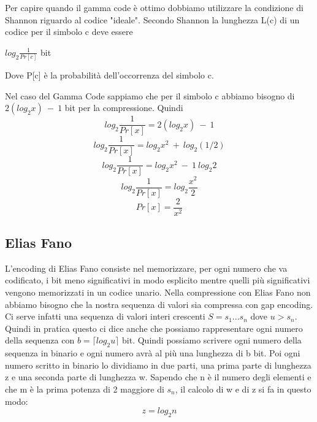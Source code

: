 \documentclass[14pt]{extreport}
\begin{document}
Per capire quando il gamma code è ottimo dobbiamo utilizzare la condizione di Shannon riguardo al codice "ideale".
Secondo Shannon la lunghezza L(c) di un codice per il simbolo c deve essere 
\newline 
\centerline{$log_2 \frac{1}{Pr[c]}$ bit}
Dove P[c] è la probabilità dell'occorrenza del simbolo c.

Nel caso del Gamma Code sappiamo che per il simbolo c abbiamo bisogno di $2(log_2 x) \ -\ 1$ bit per la compressione.
Quindi 
\begin{equation}
    log_2 \frac{1}{Pr[x]} = 2 (log_2 x) \ - \ 1
\end{equation}
\begin{equation}
    log_2 \frac{1}{Pr[x]} = log_2 x^2 \ + \ log_2 (1/2)
\end{equation}
\begin{equation}
    log_2 \frac{1}{Pr[x]} = log_2 x^2 \ - \ 1 \ log_2 2
\end{equation}
\begin{equation}
    log_2 \frac{1}{Pr[x]} = log_2 {\frac{x^2}{2}}
\end{equation}
\begin{equation}
    Pr[x] = \frac{2}{x^2}
\end{equation}

\subsection{Elias Fano}

L'encoding di Elias Fano consiste nel memorizzare, per ogni numero che va codificato, i bit meno significativi in modo esplicito mentre quelli più significativi vengono memorizzati in un codice unario.
Nella compressione con Elias Fano non abbiamo bisogno che la nostra sequenza di valori sia compressa con gap encoding.
Ci serve infatti una sequenza di valori interi crescenti $S = s_1 ... s_n$ dove $u > s_n$.
Quindi in pratica questo ci dice anche che possiamo rappresentare ogni numero della sequenza con $b = \lceil{log_2 u}\rceil$ bit.
Quindi possiamo scrivere ogni numero della sequenza in binario e ogni numero avrà al più una lunghezza di b bit.
Poi ogni numero scritto in binario lo dividiamo in due parti, una prima parte di lunghezza z e una seconda parte di lunghezza w.
Sapendo che n è il numero degli elementi e che m è la prima potenza di 2 maggiore di $s_n$, il calcolo di w e di z si fa in questo modo:
\begin{equation}
    z = log_2 n 
\end{equation}
\end{document}
